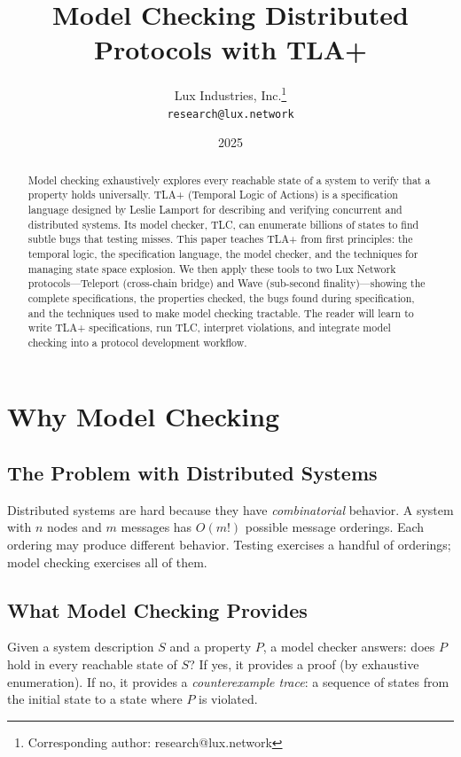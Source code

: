 \documentclass[11pt,a4paper]{article}
\title{Model Checking Distributed Protocols with TLA+}
\author{
Lux Industries, Inc.\thanks{Corresponding author: research@lux.network}\\
\texttt{research@lux.network}
}
\date{2025}
\begin{document}
\luxcoverpage

\begin{abstract}
Model checking exhaustively explores every reachable state of a system to verify that a
property holds universally. TLA+ (Temporal Logic of Actions) is a specification language
designed by Leslie Lamport for describing and verifying concurrent and distributed systems.
Its model checker, TLC, can enumerate billions of states to find subtle bugs that testing
misses. This paper teaches TLA+ from first principles: the temporal logic, the specification
language, the model checker, and the techniques for managing state space explosion. We then
apply these tools to two Lux Network protocols---Teleport (cross-chain bridge) and Wave
(sub-second finality)---showing the complete specifications, the properties checked, the
bugs found during specification, and the techniques used to make model checking tractable.
The reader will learn to write TLA+ specifications, run TLC, interpret violations, and
integrate model checking into a protocol development workflow.
\end{abstract}

\tableofcontents
\newpage

\section{Why Model Checking}

\subsection{The Problem with Distributed Systems}

Distributed systems are hard because they have \emph{combinatorial} behavior. A system
with $n$ nodes and $m$ messages has $O(m!)$ possible message orderings. Each ordering
may produce different behavior. Testing exercises a handful of orderings; model checking
exercises all of them.

\subsection{What Model Checking Provides}

Given a system description $S$ and a property $P$, a model checker answers: does $P$
hold in every reachable state of $S$? If yes, it provides a proof (by exhaustive
enumeration). If no, it provides a \emph{counterexample trace}: a sequence of states
from the initial state to a state where $P$ is violated.
\end{document}

